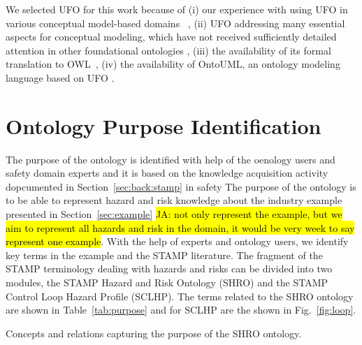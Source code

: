 \documentclass[sw]{iosart2x}
\newcommand{\COMMENT}[1]{\hl{ \textnormal{#1}}}
\newcommand{\COMMENT}[2]{\hl{ \textnormal{#1} \textbf{comment:} \textit{#2}}\xspace}
\begin{document}
We selected UFO for this work because of (i) our experience with using UFO in various conceptual model-based domains ~\cite{Kostov2017b,Kremen2017a}, (ii) UFO addressing many essential aspects for conceptual modeling, which have not
received sufficiently detailed attention in other foundational ontologies \cite{Guizzardi2005b}, (iii) the availability of its formal translation to OWL~\cite{W3COWLWorkingGroup2012}, (iv) the availability of OntoUML, an ontology modeling language based on UFO \cite{Guizzardi2005b}.


\section{Ontology Purpose Identification}
\label{sec:purpose}
The purpose of the ontology is identified with help of the oenology users and safety domain experts and it is based on the knowledge acquisition activity dopcumented in Section~\ref{sec:back:stamp}   in safety The purpose of the ontology is to be able to represent hazard and risk knowledge about the industry example presented in Section~\ref{sec:example} \COMMENT{JA: not only represent the example, but we aim to represent all hazards and risk in the domain, it would be very week to say represent one example}. With the help of experts and ontology users, we identify key terms in the example and the STAMP literature. The fragment of the STAMP terminology dealing with hazards and risks can be divided into two modules, the STAMP Hazard and Risk Ontology (SHRO) and the STAMP Control Loop Hazard Profile (SCLHP). The terms related to the SHRO ontology are shown in Table~\ref{tab:purpose} 
and for SCLHP are the shown in Fig.~\ref{fig:loop}.

\begin{table}\label{tab:purpose}\caption{Concepts and relations capturing the purpose of the SHRO ontology.}
\end{table}
\end{document}
